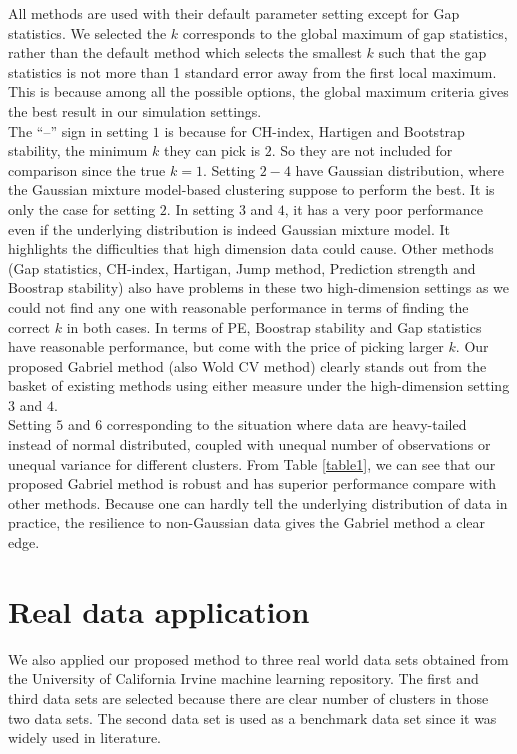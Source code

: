 \documentclass[11pt]{article}
\begin{document}
\noindent
All methods are used with their default parameter setting except for Gap statistics. We selected the $k$  corresponds to the global maximum of gap statistics, rather than the default method which selects the smallest $k$ such that the gap statistics is not more than 1 standard error away from the first local maximum. This is because among all the possible options, the global maximum criteria gives the best result in our simulation settings.\\

The ``--'' sign in setting $1$ is because for CH-index, Hartigen and Bootstrap stability, the minimum $k$ they can pick is $2$. So they are not included for comparison since the true $k=1$. Setting $2-4$ have Gaussian distribution, where the Gaussian mixture model-based clustering suppose to perform the best. It is only the case for setting $2$. In setting $3$ and $4$, it has a very poor performance even if the underlying distribution is indeed Gaussian mixture model. It highlights the difficulties that high dimension data could cause. Other methods (Gap statistics, CH-index, Hartigan, Jump method, Prediction strength and Boostrap stability) also have problems in these two high-dimension settings as we could not find any one with reasonable performance in terms of finding the correct $k$ in both cases. In terms of PE, Boostrap stability and Gap statistics have reasonable performance, but come with the price of picking larger $k$. Our proposed Gabriel method (also Wold CV method) clearly stands out from the basket of existing methods using either measure under the high-dimension setting $3$ and $4$.\\

Setting $5$ and $6$ corresponding to the situation where data are heavy-tailed instead of normal distributed, coupled with unequal number of observations or unequal variance for different clusters. From Table \ref{table1}, we can see that our proposed Gabriel method is robust and has superior performance compare with other methods. Because one can hardly tell the underlying distribution of data in practice, the resilience to non-Gaussian data gives the Gabriel method a clear edge. 
\section{Real data application}
We also applied our proposed method to three real world data sets obtained from the University of California Irvine machine learning repository. The first and third data sets are selected because there are clear number of clusters in those two data sets. The second data set is used as a benchmark data set since it was widely used in literature.\\
\end{document}
